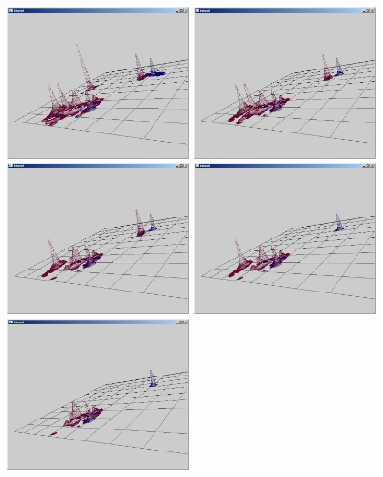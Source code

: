 \begin{figure}
\centering
\includegraphics[width=0.47\textwidth,bb=0 10 766 637]{inf1.jpg}
\includegraphics[width=0.47\textwidth,bb=0 20 766 637]{inf2.jpg}
\includegraphics[width=0.47\textwidth,bb=0 20 766 637]{inf3.jpg}
\includegraphics[width=0.47\textwidth,bb=0 20 766 637]{inf4.jpg}
\includegraphics[width=0.47\textwidth,bb=0 20 766 637]{inf5.jpg}

\end{figure}
